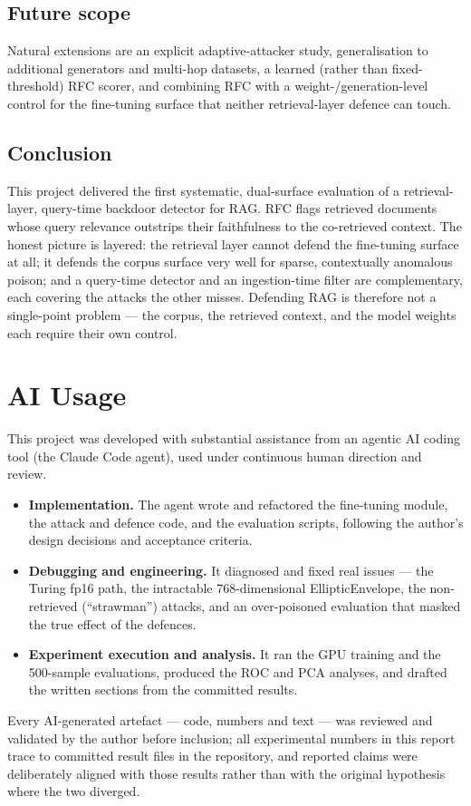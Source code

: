 \documentclass[9pt,a4paper,twoside]{rho-class/rho}
\begin{document}
\subsection{Future scope}
Natural extensions are an explicit adaptive-attacker study, generalisation to additional generators and multi-hop datasets, a learned (rather than fixed-threshold) RFC scorer, and combining RFC with a weight-/generation-level control for the fine-tuning surface that neither retrieval-layer defence can touch.

\subsection{Conclusion}
This project delivered the first systematic, dual-surface evaluation of a retrieval-layer, query-time backdoor detector for RAG. RFC flags retrieved documents whose query relevance outstrips their faithfulness to the co-retrieved context. The honest picture is layered: the retrieval layer cannot defend the fine-tuning surface at all; it defends the corpus surface very well for sparse, contextually anomalous poison; and a query-time detector and an ingestion-time filter are complementary, each covering the attacks the other misses. Defending RAG is therefore not a single-point problem --- the corpus, the retrieved context, and the model weights each require their own control.

\section{AI Usage}

This project was developed with substantial assistance from an agentic AI coding tool (the Claude Code agent), used under continuous human direction and review.
\begin{itemize}
    \item \textbf{Implementation.} The agent wrote and refactored the fine-tuning module, the attack and defence code, and the evaluation scripts, following the author's design decisions and acceptance criteria.
    \item \textbf{Debugging and engineering.} It diagnosed and fixed real issues --- the Turing fp16 path, the intractable 768-dimensional EllipticEnvelope, the non-retrieved (``strawman'') attacks, and an over-poisoned evaluation that masked the true effect of the defences.
    \item \textbf{Experiment execution and analysis.} It ran the GPU training and the 500-sample evaluations, produced the ROC and PCA analyses, and drafted the written sections from the committed results.
\end{itemize}
Every AI-generated artefact --- code, numbers and text --- was reviewed and validated by the author before inclusion; all experimental numbers in this report trace to committed result files in the repository, and reported claims were deliberately aligned with those results rather than with the original hypothesis where the two diverged.
\end{document}
